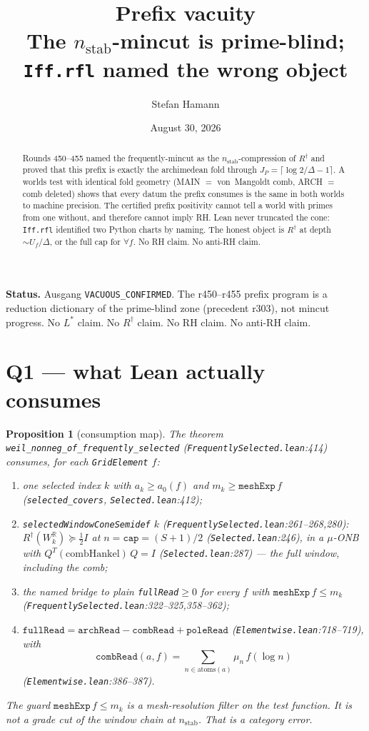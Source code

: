 \documentclass[11pt]{article}
\title{\bfseries Prefix vacuity\\[2mm]
\large The $n_{\mathrm{stab}}$-mincut is prime-blind;
\texttt{Iff.rfl} named the wrong object}
\author{Stefan Hamann}
\date{August 30, 2026}
\newtheorem{prop}{Proposition}
\theoremstyle{remark}
\newcommand{\nstab}{n_{\mathrm{stab}}}
\begin{document}
\maketitle

\begin{abstract}\noindent
Rounds 450--455 named the frequently-mincut as the
$n_{\mathrm{stab}}$-compression of $R^{\dagger}$
and proved that this prefix is exactly the
archimedean fold through $J_P=\lceil\log 2/\Delta-1\rceil$.
A worlds test with identical fold geometry
(MAIN $=$ von~Mangoldt comb, ARCH $=$ comb deleted)
shows that every datum the prefix consumes is
the same in both worlds to machine precision.
The certified prefix positivity cannot tell a
world with primes from one without, and therefore
cannot imply RH.
Lean never truncated the cone: \texttt{Iff.rfl}
identified two Python charts by naming.
The honest object is $R^{\dagger}$ at depth
$\sim U_f/\Delta$, or the full cap for
$\forall f$.  No RH claim.  No anti-RH claim.
\end{abstract}

\medskip\noindent
\textbf{Status.}\enspace
Ausgang \texttt{VACUOUS\_CONFIRMED}.
The r450--r455 prefix program is a
reduction dictionary of the prime-blind zone
(precedent r303), not mincut progress.
No $L^{*}$ claim.  No $R^{\dagger}$ claim.
No RH claim.  No anti-RH claim.

\section{Q1 --- what Lean actually consumes}\label{sec:q1}

\begin{prop}[consumption map]\label{prop:map}
The theorem
\texttt{weil\_nonneg\_of\_frequently\_selected}
(\texttt{FrequentlySelected.lean}:414)
consumes, for each \texttt{GridElement} $f$:
\begin{enumerate}
\item one selected index $k$ with
$a_k\ge a_0(f)$ and $m_k\ge\texttt{meshExp}\,f$
(\texttt{selected\_covers}, \texttt{Selected.lean}:412);
\item \texttt{selectedWindowConeSemidef} $k$
(\texttt{FrequentlySelected.lean}:261--268,280):
$R^{\dagger}(W^{\mathbb{R}}_k)\succeq\tfrac12 I$ at
$n=\mathtt{cap}=(S+1)/2$
(\texttt{Selected.lean}:246), in a
$\mu$-ONB with $Q^{T}(\mathrm{combHankel})\,Q=I$
(\texttt{Selected.lean}:287) --- the
\emph{full} window, including the comb;
\item the named bridge to plain
\texttt{fullRead}$\ge 0$ for every $f$ with
$\texttt{meshExp}\,f\le m_k$
(\texttt{FrequentlySelected.lean}:322--325,358--362);
\item $\texttt{fullRead}=\texttt{archRead}-\texttt{combRead}+\texttt{poleRead}$
(\texttt{Elementwise.lean}:718--719), with
\[
\texttt{combRead}(a,f)
=\sum_{n\in\mathrm{atoms}(a)}\mu_n\,f(\log n)
\]
(\texttt{Elementwise.lean}:386--387).
\end{enumerate}
The guard $\texttt{meshExp}\,f\le m_k$ is a
\emph{mesh-resolution} filter on the test function.
It is not a grade cut of the window chain at
$\nstab$.  That is a category error.
\end{prop}
\end{document}
